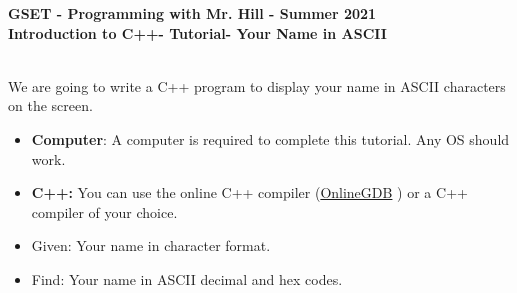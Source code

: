 \documentclass[12pt]{article}
\newcommand{\MNUM}{4} %
\newcommand{\MNAME}{Introduction to C++} %
\newcommand{\TNAME}{Your Name in ASCII} %
\begin{document}
\thispagestyle{plain}

\begin{center}
   {\bf \large GSET - Programming with Mr. Hill - Summer 2021} \vspace{5mm}\\
   {\bf \Large \MNAME \hspc -  Tutorial\hspc\MNUM\hspc - \TNAME}\vspace{3mm}\\
   
\end{center}


\begin{description}[labelindent=1cm]
	
	\item[\textbf{\underline{Overview:}}] \hfill \vspace{3mm}\\
	We are going to write a C++ program to display your name in ASCII characters on the screen. 
	
	\item[\textbf{\underline{System Requirements:}}] \hfill \vspace{0mm}

\begin{itemize}
	\item {\bf Computer}: A computer is required to complete this tutorial. Any OS should work.
	\item {\bf C++:} You can use the online C++ compiler (\href{https://www.onlinegdb.com/online\_c++\_compiler}{OnlineGDB} ) or a C++ compiler of your choice.
\end{itemize}

	\item[\textbf{\underline{Problem Statement:}}] \hfill \vspace{0mm}
	
	\begin{itemize}

		\item Given: Your name in character format.
		
		\item Find: Your name in ASCII decimal and hex codes.
		 
	\end{itemize}

\item[\textbf{\underline{Program Minimum Requirements:}}] \hfill \vspace{0mm}


\end{description}
\end{document}
